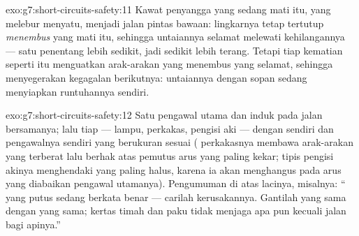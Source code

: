 \begin{solution}{exo:g7:short-circuits-safety:11}
Kawat penyangga  yang sedang mati itu, yang melebur menyatu,
menjadi jalan pintas bawaan: lingkarnya tetap tertutup \emph{menembus}
  yang mati itu, sehingga untaiannya selamat melewati
kehilangannya --- satu penentang lebih sedikit, jadi sedikit lebih
terang. Tetapi tiap kematian seperti itu menguatkan arak-arakan yang
menembus  yang selamat, sehingga menyegerakan kegagalan
berikutnya: untaiannya dengan sopan sedang menyiapkan runtuhannya
sendiri.
\end{solution}

\begin{solution}{exo:g7:short-circuits-safety:12}
Satu pengawal utama dan  induk pada jalan bersamanya; lalu tiap
 --- lampu, perkakas, pengisi aki --- dengan  sendiri
dan pengawalnya sendiri yang berukuran sesuai  (
perkakasnya membawa arak-arakan yang terberat lalu berhak atas pemutus
arus yang paling kekar;  tipis pengisi akinya menghendaki 
yang paling halus, karena ia akan menghangus pada arus yang diabaikan
pengawal utamanya). Pengumuman di atas lacinya, misalnya: ``
yang putus sedang berkata benar --- carilah kerusakannya. Gantilah
yang sama dengan yang sama; kertas timah dan paku tidak menjaga apa
pun kecuali jalan bagi apinya.''
\end{solution}

